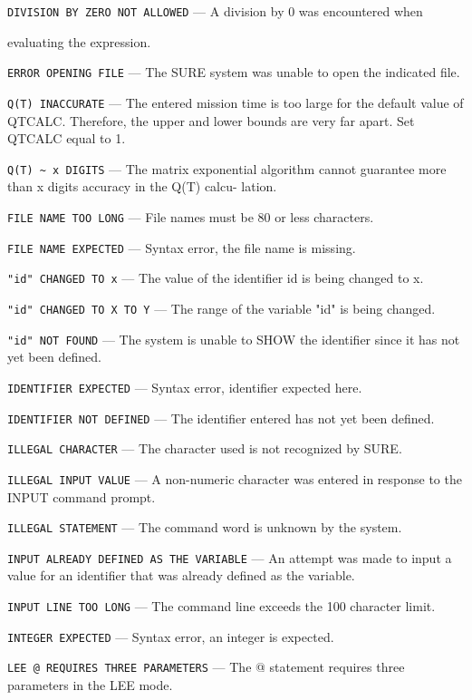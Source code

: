 \noindent \verb|DIVISION BY ZERO NOT ALLOWED| --- 
A division by 0 was encountered when 

evaluating the expression.

\noindent \verb|ERROR OPENING FILE| --- 
The SURE system was unable to open the indicated file.

\noindent \verb|Q(T) INACCURATE| --- 
The entered mission time is too large for the default value of QTCALC.
Therefore, the upper and lower bounds are very far apart.  Set QTCALC equal to
1.

\noindent \verb|Q(T) ~ x DIGITS| --- 
The matrix exponential algorithm cannot guarantee more than x digits accuracy
in the Q(T) calcu- lation.

\noindent \verb|FILE NAME TOO LONG| --- 
File names must be 80 or less characters.

\noindent \verb|FILE NAME EXPECTED| --- 
Syntax error, the file name is missing.

\noindent \verb|"id" CHANGED TO x| --- 
The value of the identifier id is being changed to x.

\noindent \verb|"id" CHANGED TO X TO Y| --- 
The range of the variable "id" is being changed.

\noindent \verb|"id" NOT FOUND| --- 
The system is unable to SHOW the identifier since it has not yet been defined.

\noindent \verb|IDENTIFIER EXPECTED| --- 
Syntax error, identifier expected here.

\noindent \verb|IDENTIFIER NOT DEFINED| --- 
The identifier entered has not yet been defined.

\noindent \verb|ILLEGAL CHARACTER| --- 
The character used is not recognized by SURE.

\noindent \verb|ILLEGAL INPUT VALUE| --- 
A non-numeric character was entered in response to the INPUT command prompt.

\noindent \verb|ILLEGAL STATEMENT| --- 
The command word is unknown by the system.

\noindent \verb|INPUT ALREADY DEFINED AS THE VARIABLE| --- 
An attempt was made to input a value for an identifier that was 
already defined as the variable.

\noindent \verb|INPUT LINE TOO LONG| --- 
The command line exceeds the 100 character limit.

\noindent \verb|INTEGER EXPECTED| --- 
Syntax error, an integer is expected.

\noindent \verb|LEE @ REQUIRES THREE PARAMETERS| --- 
The @ statement requires three parameters in the LEE mode.

